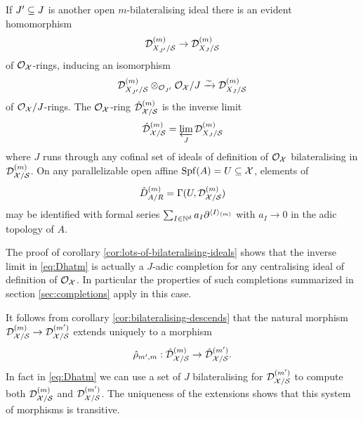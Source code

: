 \documentclass{article}
\theoremstyle{change}
\numberwithin{equation}{subsubsection}
\newenvironment{remark}{\medskip\noindent{\textit{Remark.}}}{\medskip}
\begin{document}
If $J'\subseteq J$ is another open $m$-bilateralising ideal there is an
evident homomorphism
\begin{displaymath}
  {{\cal D}}^{({m})}_{X_{J'}/{\cal S}}\to{{\cal D}}^{({m})}_{X_J/{\cal S}}
\end{displaymath}
of ${\cal O}_{\cal X}$-rings, inducing an isomorphism
\begin{displaymath}
  {{\cal D}}^{({m})}_{X_{J'}/{\cal S}}\otimes_{{\cal O}_{J'}}{\cal O}_{\cal X}/J
  \xrightarrow{\sim}{{\cal D}}^{({m})}_{X_J/{\cal S}}
\end{displaymath}
of ${\cal O}_{\cal X}/J$-rings. The ${\cal O}_{\cal X}$-ring ${\hat{\cal D}}^{({m})}_{{\cal X}/{\cal S}}$ is the
inverse limit
\begin{equation}
  \label{eq:Dhatm}
  {\hat{\cal D}}^{({m})}_{{\cal X}/{\cal S}}=\varprojlim_J{{\cal D}}^{({m})}_{X_J/{\cal S}}
\end{equation}
where $J$ runs through any cofinal set of ideals of definition of
${\cal O}_{\cal X}$ bilateralising in ${{\cal D}}^{({m})}_{{\cal X}/{\cal S}}$. On any
parallelizable open affine ${\operatorname{Spf}({A})}=U\subseteq{\cal X}$, elements of
\begin{displaymath}
  {\hat D}^{({m})}_{A/R}=\Gamma(U,{{\cal D}}^{({m})}_{{\cal X}/{\cal S}})
\end{displaymath}
may be identified with formal series
$\sum_{I\in{\mathbb N}^d}a_I{{\partial}}^{\langle{I}\rangle_{(m)}}$ with $a_I\to 0$ in the adic
topology of $A$. 

\begin{remark}
  The proof of corollary \ref{cor:lots-of-bilateralising-ideals} shows
  that the inverse limit in \ref{eq:Dhatm} is actually a $J$-adic
  completion for any centralising ideal of definition of ${\cal O}_{\cal X}$. In
  particular the properties of such completions summarized in section
  \ref{sec:completions} apply in this case.
\end{remark}

It follows from corollary \ref{cor:bilateralising-descends} that
the natural morphism ${{\cal D}}^{({m})}_{{\cal X}/{\cal S}}\to{{\cal D}}^{({m'})}_{{\cal X}/{\cal S}}$
extends uniquely to a morphism
\begin{equation}
  \label{eq:Dmhat-change-of-level}
  \hat\rho_{m',m}:{\hat{\cal D}}^{({m})}_{{\cal X}/{\cal S}}\to {\hat{\cal D}}^{({m'})}_{{\cal X}/{\cal S}}.
\end{equation}
In fact in \ref{eq:Dhatm} we can use a set of $J$ bilateralising for
${{\cal D}}^{({m'})}_{{\cal X}/{\cal S}}$ to compute both ${{\cal D}}^{({m})}_{{\cal X}/{\cal S}}$ and
${{\cal D}}^{({m'})}_{{\cal X}/{\cal S}}$. The uniqueness of the extensions shows that
this system of morphisms is transitive.
\end{document}
